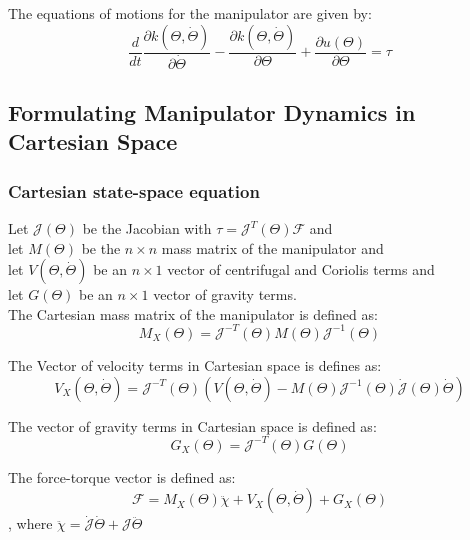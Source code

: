 \documentclass[10pt,a4paper]{article}
\begin{document}
The equations of motions for the manipulator are given by:
$$
	\frac d {dt} \frac {\partial k(\Theta, \dot \Theta)}{\partial \dot \Theta} - \frac {\partial k(\Theta, \dot \Theta)}{\partial \Theta} + \frac {\partial u(\Theta)}{\partial \Theta} = \tau
$$

\subsection{Formulating Manipulator Dynamics in Cartesian Space}
\subsubsection{Cartesian state-space equation}
Let $\mathcal{J}(\Theta)$ be the Jacobian with $\tau = \mathcal{J}^T(\Theta)\mathcal{F}$ and \\
let $M(\Theta)$ be the $n \times n$ mass matrix of the manipulator and \\
let $V(\Theta, \dot{\Theta})$ be an $n \times 1$ vector of centrifugal and Coriolis terms and \\
let $G(\Theta)$ be an $n \times 1$ vector of gravity terms. \\

The Cartesian mass matrix of the manipulator is defined as:
$$
	M_X(\Theta) = \mathcal{J}^{-T}(\Theta)M(\Theta)\mathcal{J}^{-1}(\Theta)
$$

The Vector of velocity terms in Cartesian space is defines as:
$$
	V_X(\Theta, \dot \Theta) = \mathcal{J}^{-T}(\Theta)(V(\Theta, \dot \Theta) - M(\Theta)\mathcal{J}^{-1}(\Theta)\dot{\mathcal{J}}(\Theta)\dot \Theta)
$$

The vector of gravity terms in Cartesian space is defined as:
$$
	G_X(\Theta) = \mathcal{J}^{-T}(\Theta)G(\Theta)
$$

The force-torque vector is defined as:
$$
	\mathcal{F} = M_X(\Theta) \ddot \chi + V_X(\Theta, \dot \Theta) + G_X(\Theta)
$$
, where $\ddot{\chi} = \dot{\mathcal{J}} \dot \Theta + \mathcal{J} \ddot \Theta$
\end{document}
